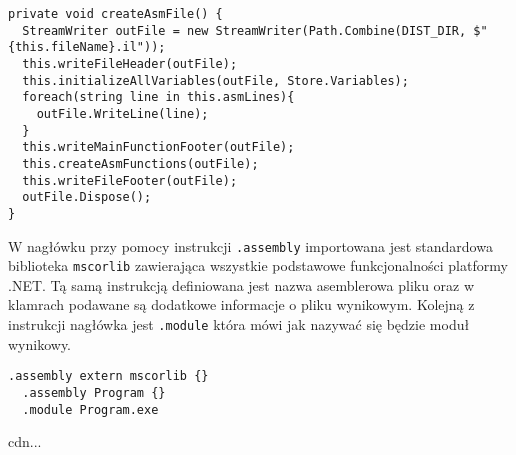 \begin{lstlisting}[language=CSharp, caption={Implementacja funkcji generująca plik wynikowy}, label=alg:cs]
private void createAsmFile() {
  StreamWriter outFile = new StreamWriter(Path.Combine(DIST_DIR, $"{this.fileName}.il"));
  this.writeFileHeader(outFile);
  this.initializeAllVariables(outFile, Store.Variables);
  foreach(string line in this.asmLines){
    outFile.WriteLine(line);
  }
  this.writeMainFunctionFooter(outFile);
  this.createAsmFunctions(outFile);
  this.writeFileFooter(outFile);
  outFile.Dispose();
}
\end{lstlisting}

\par W nagłówku przy pomocy instrukcji \texttt{.assembly} importowana jest standardowa biblioteka \texttt{mscorlib} zawierająca wszystkie podstawowe funkcjonalności platformy .NET. Tą samą instrukcją definiowana jest nazwa asemblerowa pliku oraz w klamrach podawane są dodatkowe informacje o pliku wynikowym. Kolejną z instrukcji nagłówka jest \texttt{.module} która mówi jak nazywać się będzie moduł wynikowy.

\begin{lstlisting}[language=IL, caption={Kod nagłówka pliku wygenerowanego pliku asemblera}, label=alg:asm]
  .assembly extern mscorlib {}
  .assembly Program {}
  .module Program.exe
\end{lstlisting}

cdn...
